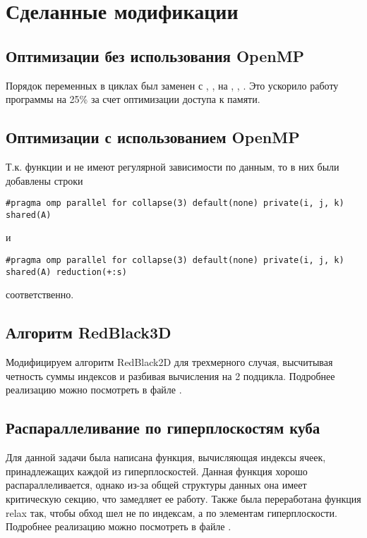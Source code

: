\section{Сделанные модификации}


\subsection{Оптимизации без использования OpenMP}
Порядок переменных в циклах был заменен с , ,  на , , . Это ускорило работу программы на 25\% за счет оптимизации доступа к памяти.

\subsection{Оптимизации с использованием OpenMP}
Т.к. функции  и  не имеют регулярной зависимости по данным, то в них были добавлены строки
\begin{lstlisting}
#pragma omp parallel for collapse(3) default(none) private(i, j, k) shared(A)
\end{lstlisting}
и
\begin{lstlisting}
#pragma omp parallel for collapse(3) default(none) private(i, j, k) shared(A) reduction(+:s)
\end{lstlisting}
соответственно.

\subsection{Алгоритм RedBlack3D}
Модифицируем алгоритм RedBlack2D для трехмерного случая, высчитывая четность суммы индексов  и разбивая вычисления на 2 подцикла. Подробнее реализацию можно посмотреть в файле .

\subsection{Распараллеливание по гиперплоскостям куба}
Для данной задачи была написана функция, вычисляющая индексы ячеек, принадлежащих каждой из гиперплоскостей. Данная функция хорошо распараллеливается, однако из-за общей структуры данных она имеет критическую секцию, что замедляет ее работу. Также была переработана функция relax так, чтобы обход шел не по индексам, а по элементам гиперплоскости. Подробнее реализацию можно посмотреть в файле .




